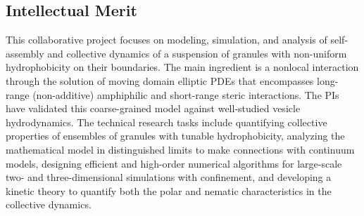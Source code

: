 \documentclass[11pt]{article}
\begin{document}
\subsection*{Intellectual Merit}
\vspace{-0.1in}
This collaborative project focuses on modeling, simulation, and analysis
of self-assembly and collective dynamics of a suspension of granules
with non-uniform hydrophobicity on their boundaries. The main ingredient
is a nonlocal interaction through the solution of moving domain elliptic
PDEs that encompasses long-range (non-additive) amphiphilic and
short-range steric interactions. The PIs have validated this
coarse-grained model against well-studied vesicle hydrodynamics. The
technical research tasks include quantifying collective properties of
ensembles of granules with tunable hydrophobicity, analyzing the
mathematical model in distinguished limits to make connections with
continuum models, designing efficient and high-order numerical
algorithms for large-scale two- and three-dimensional simulations with
confinement, and developing a kinetic theory to quantify both the polar
and nematic characteristics in the collective dynamics.


\vspace{-0.1in}
\end{document}
